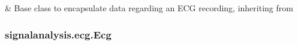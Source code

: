 \documentclass[letterpaper,10pt,english]{sphinxmanual}
\begin{document}
\begin{savenotes}\sphinxatlongtablestart\begin{longtable}[c]{}
\hline

\endfirsthead

%
{}\\
\hline

\endhead

\hline
{}\\
\endfoot

\endlastfoot

\sphinxAtStartPar
{\hyperref[\detokenize{_autosummary/signalanalysis.ecg.Ecg:signalanalysis.ecg.Ecg}]{}}
&
\sphinxAtStartPar
Base class to encapsulate data regarding an ECG recording, inheriting from {\hyperref[\detokenize{_autosummary/signalanalysis.general.Signal:signalanalysis.general.Signal}]{}}
\\
\hline
\end{longtable}\sphinxatlongtableend\end{savenotes}


\subsubsection{signalanalysis.ecg.Ecg}
\label{\detokenize{_autosummary/signalanalysis.ecg.Ecg:signalanalysis-ecg-ecg}}\label{\detokenize{_autosummary/signalanalysis.ecg.Ecg::doc}}
\end{document}
